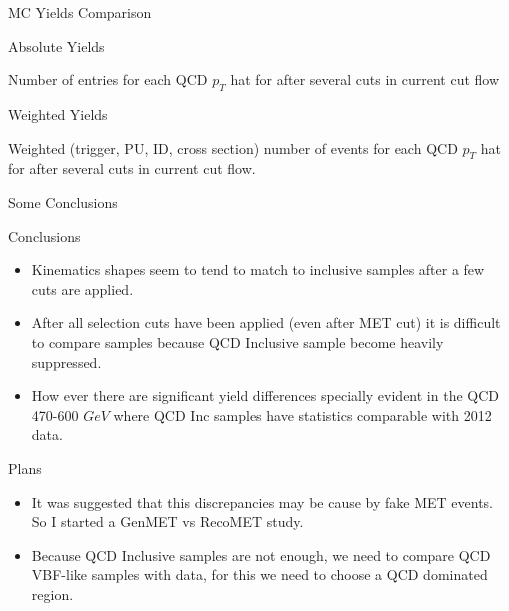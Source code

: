 \documentclass[8pt]{beamer}
\begin{document}
\begin{frame}{MC Yields Comparison}

\begin{block}{Absolute Yields}
 
\centering
\resizebox{\linewidth}{!}{}
Number of entries for each QCD $p_T$ hat for after several cuts in current cut flow

\end{block}

\begin{block}{Weighted Yields}

\centering
\resizebox{\linewidth}{!}{}
Weighted (trigger, PU, ID, cross section) number of events for each QCD $p_T$ hat for after several cuts in current cut flow.

\end{block}

\end{frame}

\begin{frame}{Some Conclusions}

\begin{block}{Conclusions}
 
\begin{itemize}
  \item Kinematics shapes seem to tend to match to inclusive samples after a few cuts are applied.
  \item After all selection cuts have been applied (even after MET cut) it is difficult to compare samples because QCD Inclusive sample become heavily suppressed.
  \item How ever there are significant yield differences specially evident in the QCD 470-600 $GeV$ where QCD Inc samples have statistics comparable with 2012 data.
\end{itemize}

\end{block}

\begin{block}{Plans}
 
\begin{itemize}
  \item It was suggested that this discrepancies may be cause by fake MET events. So I started a GenMET vs RecoMET study.
  \item Because QCD Inclusive samples are not enough, we need to compare QCD VBF-like samples with data, for this we need to choose a QCD dominated region.
\end{itemize}

\end{block}

\end{frame}
\end{document}
